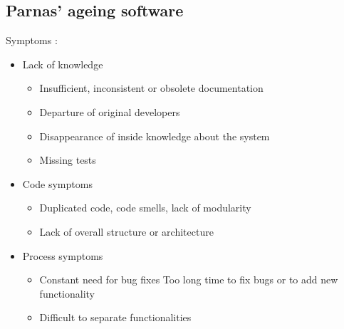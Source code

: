 \documentclass[a4paper,11pt]{report}
\begin{document}
	\subsection{Parnas' ageing software}
		Symptoms :
		\begin{itemize}
			\item Lack of knowledge
				\begin{itemize}
					\setlength{\itemsep}{0pt}		
					\setlength{\parskip}{0pt}		
					\setlength{\parsep}{0pt}	
					\item Insufficient, inconsistent or
						obsolete documentation
					\item Departure of original 
						developers
					\item Disappearance of inside 
						knowledge about the system
					\item Missing tests
				\end{itemize}
			\item Code symptoms
				\begin{itemize}
					\setlength{\itemsep}{0pt}		
					\setlength{\parskip}{0pt}		
					\setlength{\parsep}{0pt}	
					\item Duplicated code, code smells, 
						lack of modularity
					\item Lack of overall structure 
						or architecture
				\end{itemize}
			\item Process symptoms
				\begin{itemize}	
					\setlength{\itemsep}{0pt}		
					\setlength{\parskip}{0pt}		
					\setlength{\parsep}{0pt}	
					\item Constant need for bug fixes
						Too long time to fix bugs or to 
						add new functionality
					\item Difficult to separate
						functionalities
				\end{itemize}
		\end{itemize}
	\newpage
\end{document}
